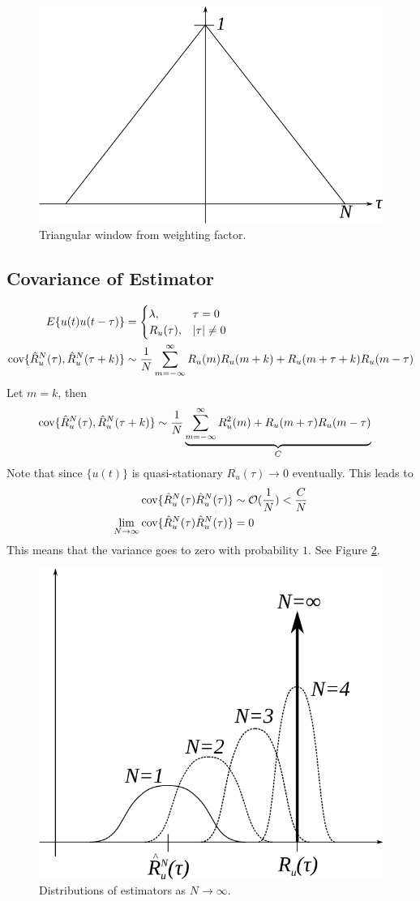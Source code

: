 \begin{figure}[ht!]
	\centering
	\includegraphics[width=.3\textwidth]{images/05triWindow}
	\caption{Triangular window from weighting factor.}
	\label{fig:05triWindow}
\end{figure}

\subsection{Covariance of Estimator}
\begin{align*}
E\{u(t)u(t-\tau)\} &= \begin{cases} \lambda, & \tau=0 \\ R_u(\tau), & |\tau|\neq 0 \end{cases} \\
\text{cov}\{\hat{R}_u^N(\tau),\hat{R}_u^N(\tau+k)\} &\sim \frac{1}{N}\sum_{m=-\infty}^\infty R_u(m)R_u(m+k) + R_u(m+\tau+k)R_u(m-\tau)
\end{align*}
Let $m=k$, then
\begin{align*}
\text{cov}\{\hat{R}_u^N(\tau),\hat{R}_u^N(\tau+k)\} &\sim \frac{1}{N}\underbrace{\sum_{m=-\infty}^\infty R_u^2(m) + R_u(m+\tau)R_u(m-\tau)}_C
\end{align*}
Note that since $\{u(t)\}$ is quasi-stationary $R_u(\tau)\to0$ eventually. This leads to
\begin{align*}
\text{cov}\{\hat{R}_u^N(\tau)\hat{R}_u^N(\tau)\} &\sim \mathcal{O}(\frac{1}{N}) < \frac{C}{N} \\
\lim_{N\to\infty}\text{cov}\{\hat{R}_u^N(\tau)\hat{R}_u^N(\tau)\} &= 0
\end{align*}
This means that the variance goes to zero with probability $1$. See Figure \ref{fig:05estDist}.
\begin{figure}[ht!]
	\centering
	\includegraphics[width=.4\textwidth]{images/05estDist}
	\caption{Distributions of estimators as $N\to\infty$.}
	\label{fig:05estDist}
\end{figure}

